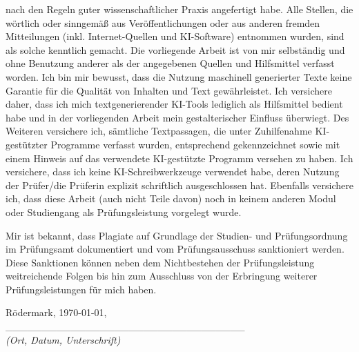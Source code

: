 {    nach den Regeln guter wissenschaftlicher Praxis angefertigt habe. Alle Stellen, die wörtlich 
    oder sinngemäß aus Veröffentlichungen oder aus anderen fremden Mitteilungen (inkl. 
    Internet-Quellen und KI-Software) entnommen wurden, sind als solche kenntlich gemacht. Die 
    vorliegende Arbeit ist von mir selbständig und ohne Benutzung anderer als der angegebenen 
    Quellen und Hilfsmittel verfasst worden. Ich bin mir bewusst, dass die Nutzung maschinell 
    generierter Texte keine Garantie für die Qualität von Inhalten und Text gewährleistet. Ich 
    versichere daher, dass ich mich textgenerierender KI-Tools lediglich als Hilfsmittel bedient 
    habe und in der vorliegenden Arbeit mein gestalterischer Einfluss überwiegt. Des Weiteren 
    versichere ich, sämtliche Textpassagen, die unter Zuhilfenahme KI-gestützter Programme verfasst 
    wurden, entsprechend gekennzeichnet sowie mit einem Hinweis auf das verwendete KI-gestützte 
    Programm versehen zu haben.  Ich versichere, dass ich keine KI-Schreibwerkzeuge verwendet habe, 
    deren Nutzung der Prüfer/die Prüferin explizit schriftlich ausgeschlossen hat. Ebenfalls 
    versichere ich, dass diese Arbeit (auch nicht Teile davon) noch in keinem anderen Modul oder 
    Studiengang als Prüfungsleistung vorgelegt wurde.  

    \vspace{0.5cm}

    Mir ist bekannt, dass Plagiate auf Grundlage der Studien- und Prüfungsordnung im Prüfungsamt 
    dokumentiert und vom Prüfungsausschuss sanktioniert werden. Diese Sanktionen können neben dem 
    Nichtbestehen der Prüfungsleistung weitreichende Folgen bis hin zum Ausschluss von der 
    Erbringung weiterer Prüfungsleistungen für mich haben. 

    \vfill

}    

\begin{flushleft}
    \small Rödermark, \today, 
    \hspace{0.5cm}
    \\[-0.6cm]
    \_\_\_\_\_\_\_\_\_\_\_\_\_\_\_\_\_\_\_\_\_\_\_\_\_\_\_\_\_\_\_\_\_ \\
    \small\textit{(Ort, Datum, Unterschrift)}
\end{flushleft}
